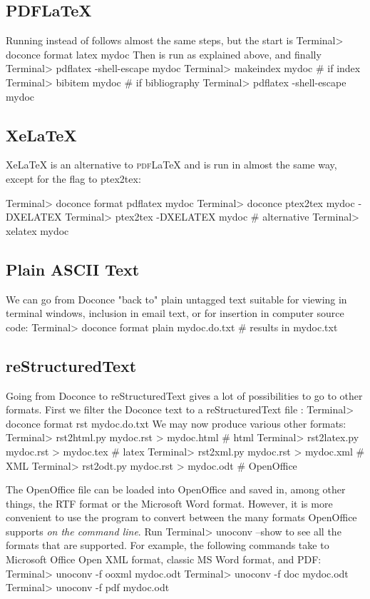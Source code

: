 \documentclass[%
oneside,                 %
final,                   %
10pt]{article}
\begin{document}
{{{{{\subsection{PDFLaTeX}

Running  instead of  follows almost the same steps,
but the start is
\bsys
Terminal> doconce format latex mydoc
\esys
Then  is run as explained above, and finally
\bsys
Terminal> pdflatex -shell-escape mydoc
Terminal> makeindex mydoc   # if index
Terminal> bibitem mydoc     # if bibliography
Terminal> pdflatex -shell-escape mydoc
\esys

\subsection{XeLaTeX}

XeLaTeX is an alternative to \textsc{pdf}{\LaTeX} and is run in almost the
same way, except for the  flag to ptex2tex:

\bccq
Terminal> doconce format pdflatex mydoc
Terminal> doconce ptex2tex mydoc -DXELATEX
Terminal> ptex2tex -DXELATEX mydoc  # alternative
Terminal> xelatex mydoc
\eccq


\subsection{Plain ASCII Text}

We can go from Doconce "back to" plain untagged text suitable for viewing
in terminal windows, inclusion in email text, or for insertion in
computer source code:
\bsys
Terminal> doconce format plain mydoc.do.txt  # results in mydoc.txt
\esys

\subsection{reStructuredText}

Going from Doconce to reStructuredText gives a lot of possibilities to
go to other formats. First we filter the Doconce text to a
reStructuredText file :
\bsys
Terminal> doconce format rst mydoc.do.txt
\esys
We may now produce various other formats:
\bsys
Terminal> rst2html.py  mydoc.rst > mydoc.html # html
Terminal> rst2latex.py mydoc.rst > mydoc.tex  # latex
Terminal> rst2xml.py   mydoc.rst > mydoc.xml  # XML
Terminal> rst2odt.py   mydoc.rst > mydoc.odt  # OpenOffice
\esys

The OpenOffice file  can be loaded into OpenOffice and
saved in, among other things, the RTF format or the Microsoft Word format.
However, it is more convenient to use the program 
to convert between the many formats OpenOffice supports \emph{on the command line}.
Run
\bsys
Terminal> unoconv --show
\esys
to see all the formats that are supported.
For example, the following commands take
 to Microsoft Office Open XML format,
classic MS Word format, and PDF:
\bsys
Terminal> unoconv -f ooxml mydoc.odt
Terminal> unoconv -f doc mydoc.odt
Terminal> unoconv -f pdf mydoc.odt
\esys

}}}}}
\end{document}
